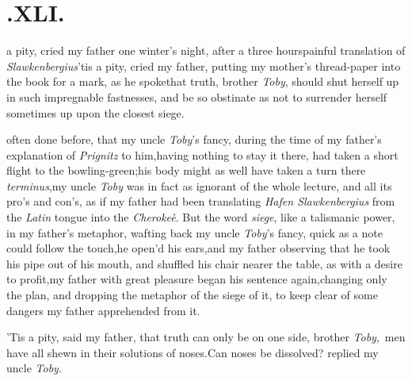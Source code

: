 \documentclass{article}
\begin{document}
\vfill


\newpage
\null
\section{.\quad  XLI.}

 a pity, cried my father
one winter’s night, after a three hours\break painful translation
of \textit{Slawkenbergius}\tsk ’tis a pity, cried my
father, putting my mother’s thread-paper into the book for a
mark, as he spoke\tsh that truth, bro\-ther \textit{Toby},
should shut herself up in such impregnable fastnesses, and be so
obstinate as not to surrender herself sometimes up upon the closest
siege.\tsh

\noindent
{} often
done before, that my uncle \textit{Toby}’s fancy, during the
time of my father’s explanation of \textit{Prignitz} to
him,\tsh having nothing to stay it there, had taken a short
flight to the bowling-green;\tsh his body might as well have
taken a turn there
\textit{terminus},\tsh my uncle \textit{Toby} was in fact\break
as ignorant
of the whole lecture, and all its pro’s and con’s, as if my
father had been translating \textit{Hafen Slawkenbergius}\break
from the \textit{Latin} tongue into the \textit{Cherokeè}.
But the word \textit{siege}, like a talismanic\break
power, in my
father’s metaphor, wafting back my uncle \textit{Toby}’s
fancy, quick as a note could follow the touch,\tsk he open’d
his ears,\tsk and my father observing that he took his pipe
out of his mouth, and shuffled his chair nearer the table,
as with a desire to profit,\tsk my father with great
pleasure began his sentence again,\tsh changing only the
plan, and dropping the metaphor of the siege of it, to keep
clear of some dangers my father apprehended from it.

\smallskip
{}

\newpage
’Tis a pity, said my father, that truth can only be on one
side, brother \textit{Toby},\,\tsk\break
{}
men have all shewn in their solutions of
noses.\tsh Can noses be dissolved? repli\-ed my uncle
\textit{Toby}.\tsh
\end{document}
